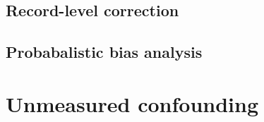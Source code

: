 \documentclass[
]{book}
\begin{document}
\hypertarget{record-level-correction}{%
\subsection{Record-level correction}\label{record-level-correction}}

\hypertarget{probabalistic-bias-analysis}{%
\subsection{Probabalistic bias analysis}\label{probabalistic-bias-analysis}}

\hypertarget{unmeasured-confounding}{%
\section{Unmeasured confounding}\label{unmeasured-confounding}}

  
\end{document}
